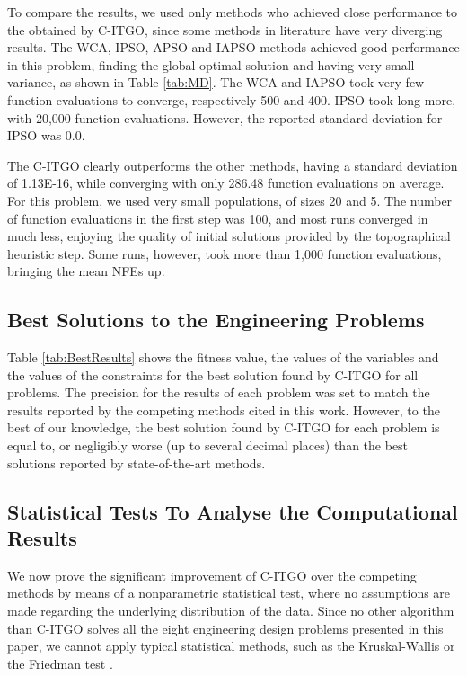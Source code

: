 To compare the results, we used only methods who achieved close performance to the obtained by C-ITGO, since some methods in literature have very diverging results. The WCA, IPSO, APSO and IAPSO methods achieved good performance in this problem, finding the global optimal solution and having very small variance, as shown in Table \ref{tab:MD}. The WCA and IAPSO took very few function evaluations to converge, respectively 500 and 400. IPSO took long more, with 20,000 function evaluations. However, the reported standard deviation for IPSO was 0.0.



The C-ITGO clearly outperforms the other methods, having a standard deviation of 1.13E-16, while converging with only 286.48 function evaluations on average. For this problem, we used very small populations, of sizes 20 and 5. The number of function evaluations in the first step was 100, and most runs converged in much less, enjoying the quality of initial solutions provided by the topographical heuristic step. Some runs, however, took more than 1,000 function evaluations, bringing the mean NFEs up.



\subsection{Best Solutions to the Engineering Problems}

Table \ref{tab:BestResults} shows the fitness value, the values of the variables and the values of the constraints for the best solution found by C-ITGO for all problems. The precision for the results of each problem was set to match the results reported by the competing methods cited in this work. However, to the best of our knowledge, the best solution found by C-ITGO for each problem is equal to, or negligibly worse (up to several decimal places) than the best solutions reported by state-of-the-art methods.




\subsection{Statistical Tests To Analyse the Computational Results}

We now prove the significant improvement of C-ITGO over the competing methods by means of a nonparametric statistical test, where no assumptions are made regarding the underlying distribution of the data. Since no other algorithm than C-ITGO solves all the eight engineering design problems presented in this paper, we cannot apply typical statistical methods, such as the Kruskal-Wallis \citep{Kruskal} or the Friedman test \citep{Friedman}.

